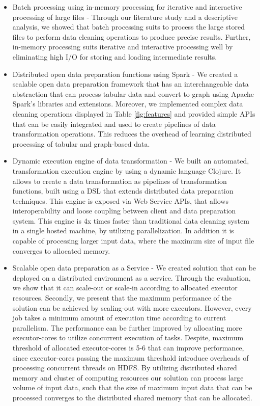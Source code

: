 \begin{itemize}
\item Batch processing using in-memory processing for iterative and interactive processing of large files - Through our literature study and a descriptive analysis, we showed that batch processing suits to process the large stored files to perform data cleaning operations to produce precise results. Further, in-memory processing suits iterative and interactive processing well by eliminating high I/O for storing and loading intermediate results.
\item Distributed open data preparation functions using Spark - We created a scalable open data preparation framework that has an interchangeable data abstraction that can process tabular data and convert to graph using Apache Spark's libraries and extensions. Moreover, we implemented complex data cleaning operations displayed in Table \ref{fig:features} and provided simple APIs that can be easily integrated and used to create pipelines of data transformation operations. This reduces the overhead of learning distributed processing of tabular and graph-based data. 
\item Dynamic execution engine of data transformation - We built an automated, transformation execution engine by using a dynamic language Clojure. It allows to create a data transformation as pipelines of transformation functions, built using a DSL that extends distributed data preparation techniques. This engine is exposed via Web Service APIs, that allows interoperability and loose coupling between client and data preparation system. This engine is 4x times faster than traditional data cleaning system in a single hosted machine, by utilizing parallelization. In addition it is capable of processing larger input data, where the maximum size of input file converges to allocated memory. 
\item Scalable open data preparation as a Service - We created solution that can be deployed on a distributed environment as a service. Through the evaluation, we show that it can scale-out or scale-in according to allocated  executor resources. Secondly, we present that the maximum performance of the solution can be achieved by scaling-out with more executors. However, every job takes a minimum amount of execution time according to current parallelism. The performance can be further improved by allocating more executor-cores to utilize concurrent execution of tasks. Despite, maximum threshold of allocated executor-cores is 5-6 that can improve performance, since executor-cores passing the maximum threshold introduce overheads of processing concurrent threads on HDFS. By utilizing distributed shared memory and cluster of computing resources our solution can process large volume of input data, such that the size of maximum input data that can be processed converges to the distributed shared memory that can be allocated.

\end{itemize}
